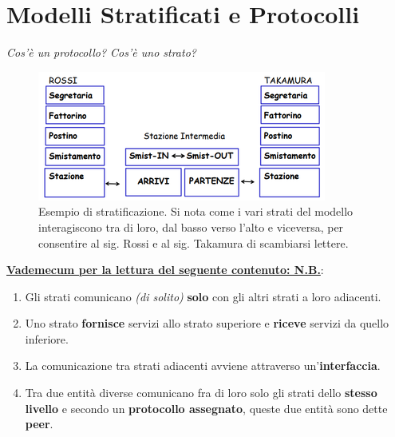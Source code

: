 \documentclass[11pt,a4paper,oneside]{book}
\theoremstyle{definition}
\begin{document}
\pagebreak

\chapter{Modelli Stratificati e Protocolli}
\textit{Cos'è un protocollo? Cos'è uno strato?}

\begin{figure}[!h]
	\includegraphics[scale=0.7]{Immagini/Postale.png}
	\centering
	\caption{Esempio di stratificazione. Si nota come i vari strati del modello interagiscono tra di loro, dal basso verso l'alto e viceversa, per consentire al sig. Rossi e al sig. Takamura di scambiarsi lettere.}
\end{figure}
\textbf{\underline{Vademecum per la lettura del seguente contenuto: N.B.}}:
\begin{enumerate}
	\item Gli strati comunicano \textit{(di solito)} \textbf{solo} con gli altri strati a loro adiacenti.
	\item Uno strato \textbf{fornisce} servizi allo strato superiore e \textbf{riceve} servizi da quello inferiore.
	\item La comunicazione tra strati adiacenti avviene attraverso un'\textbf{interfaccia}.
	\item Tra due entità diverse comunicano fra di loro solo gli strati dello \textbf{stesso livello} e secondo un \textbf{protocollo assegnato}, queste due entità sono dette \textbf{peer}.
\end{enumerate}

\pagebreak
\end{document}
